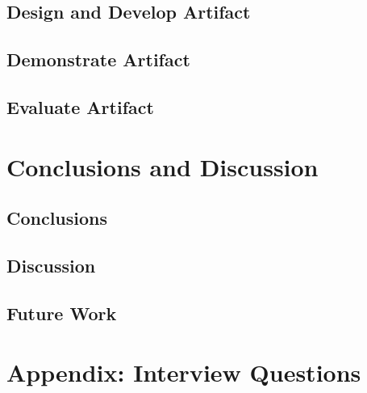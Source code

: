 \documentclass[12pt, a4, twoside, openright]{book}
\begin{document}
    \section{Design and Develop Artifact}
    \label{sec:design}
    
    
    \section{Demonstrate Artifact}
    \label{sec:demo}
    
    
    \section{Evaluate Artifact}
    \label{sec:evaluate}
      
    

    \chapter{Conclusions and Discussion}
    \label{chap:conclusions_discussion}
    
    \section{Conclusions}
    \label{sec:conclusions}
    
    
    \section{Discussion}
    \label{sec:discussion}
    
    
    \section{Future Work}
    \label{sec:future}
    

    \backmatter


%    
%    

%    
%    


    
    

    \appendix
    \chapter{Appendix: Interview Questions}
    \label{appendix:questions}
    

    \finalpageDSV

    
    
\end{document}
